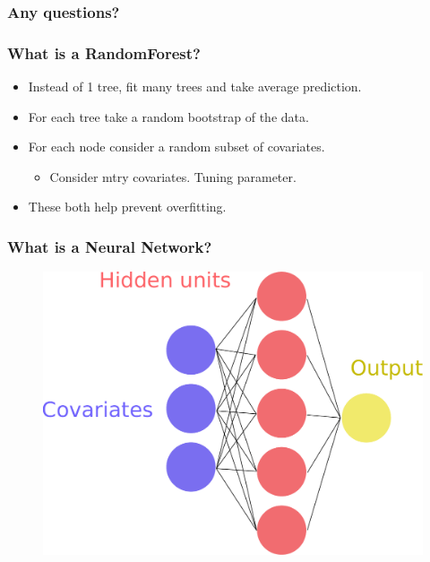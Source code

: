 \documentclass[handout, aspectratio = 169]{beamer}
\begin{document}
\begin{frame}
\frametitle{Any questions?}


\end{frame} 





\begin{frame}
\frametitle{What is a RandomForest?}

\begin{itemize}
\item Instead of 1 tree, fit many trees and take average prediction.
\item For each tree take a random bootstrap of the data.
\item For each node consider a random subset of covariates.
	\begin{itemize}
	\item Consider mtry covariates. Tuning parameter.
	\end{itemize}
\item These both help prevent overfitting.
\end{itemize}
\end{frame} 


\begin{frame}
\frametitle{What is a Neural Network?}

\vspace{6mm}
\begin{figure}
    \includegraphics[height = 0.7\textheight]{neural_network.pdf}
\end{figure} 
\end{frame} 
\end{document}
